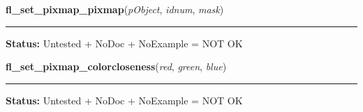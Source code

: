     \label{xformslib:library:fl_set_pixmap_pixmap}

    \vspace{0.5ex}

\hspace{.8\funcindent}\begin{boxedminipage}{\funcwidth}

    \raggedright \textbf{fl\_set\_pixmap\_pixmap}(\textit{pObject}, \textit{idnum}, \textit{mask})

    \vspace{-1.5ex}

    \rule{\textwidth}{0.5\fboxrule}
\setlength{\parskip}{2ex}
\setlength{\parskip}{1ex}
\textbf{Status:} Untested + NoDoc + NoExample = NOT OK



    \end{boxedminipage}

    \label{xformslib:library:fl_set_pixmap_colorcloseness}

    \vspace{0.5ex}

\hspace{.8\funcindent}\begin{boxedminipage}{\funcwidth}

    \raggedright \textbf{fl\_set\_pixmap\_colorcloseness}(\textit{red}, \textit{green}, \textit{blue})

    \vspace{-1.5ex}

    \rule{\textwidth}{0.5\fboxrule}
\setlength{\parskip}{2ex}
\setlength{\parskip}{1ex}
\textbf{Status:} Untested + NoDoc + NoExample = NOT OK



    \end{boxedminipage}

    \label{xformslib:library:fl_free_pixmap_pixmap}

    \vspace{0.5ex}

